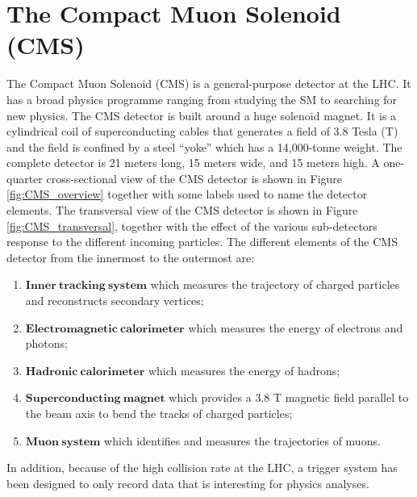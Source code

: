 \section{The Compact Muon Solenoid (CMS)}\label{sec:CMS}
The Compact Muon Solenoid (CMS) is a general-purpose detector at the LHC. It has a broad physics programme ranging from studying the SM to searching for new physics. The CMS detector is built around a huge solenoid magnet. It is a cylindrical coil of superconducting cables that generates a field of 3.8 Tesla (T) and the field is confined by a steel  ``yoke'' which has a 14,000-tonne weight. The complete detector is 21 meters long, 15 meters wide, and 15 meters high. A one-quarter cross-sectional view of the CMS detector is shown in Figure \ref{fig:CMS_overview} together with some labels used to name the
detector elements. The transversal view of the CMS detector is shown in Figure \ref{fig:CMS_transversal}, together with the effect of the various sub-detectors response to the different incoming particles. The different elements of the CMS detector from the innermost to the outermost are:

\begin{enumerate}
\item $\mathbf{Inner~tracking~system}$ which measures the trajectory of charged particles and reconstructs secondary vertices;
\item $\mathbf{Electromagnetic~calorimeter}$ which measures the energy of electrons and photons;
\item $\mathbf{Hadronic~calorimeter}$ which measures the energy of hadrons;
\item $\mathbf{Superconducting~magnet}$ which provides a 3.8 T magnetic field parallel to the beam axis to bend the tracks of charged particles;
\item $\mathbf{Muon~system}$ which identifies and measures the trajectories of muons.
\end{enumerate}
In addition, because of the high collision rate at the LHC, a trigger system has been designed to only record data that is interesting for physics analyses.

